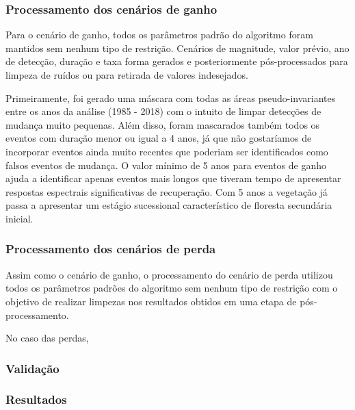 \documentclass[12pt,a4paper]{article}
\begin{document}
\subsubsection{Processamento dos cenários de ganho}
Para o cenário de ganho, todos os parâmetros padrão do algoritmo foram mantidos sem nenhum tipo de restrição. Cenários de magnitude, valor prévio, ano de detecção, duração e taxa forma gerados e posteriormente pós-processados para limpeza de ruídos ou para retirada de valores indesejados. 

Primeiramente, foi gerado uma máscara com todas as áreas pseudo-invariantes entre os anos da análise (1985 - 2018) com o intuito de limpar detecções de mudança muito pequenas. Além disso, foram mascarados também todos os eventos com duração menor ou igual a 4 anos, já que não gostaríamos de incorporar eventos ainda muito recentes que poderiam ser identificados como falsos eventos de mudança. O valor mínimo de 5 anos para eventos de ganho ajuda a identificar apenas eventos mais longos que tiveram tempo de apresentar respostas espectrais significativas de recuperação. Com 5 anos a vegetação já passa a apresentar um estágio sucessional característico de floresta secundária inicial. 

\subsubsection{Processamento dos cenários de perda}
Assim como o cenário de ganho, o processamento do cenário de perda utilizou todos os parâmetros padrões do algoritmo sem nenhum tipo de restrição com o objetivo de realizar limpezas nos resultados obtidos em uma etapa de pós-processamento.

No caso das perdas, 

\subsubsection{Validação}

\subsubsection{Resultados}


\newpage

%

\end{document}

